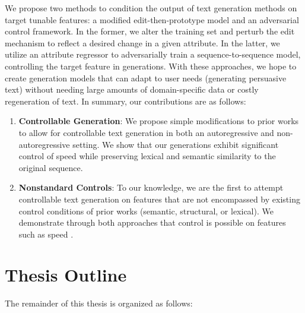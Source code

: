 We propose two methods to condition the output of text generation methods on target tunable features: a modified edit-then-prototype model \citep{guu2018generating} and an adversarial control framework. In the former, we alter the training set and perturb the edit mechanism to reflect a desired change in a given attribute. In the latter, we utilize an attribute regressor to adversarially train a sequence-to-sequence model, controlling the target feature in generations. With these approaches, we hope to create generation models that can adapt to user needs (\eg generating persuasive text) without needing large amounts of domain-specific data or costly regeneration of text. In summary, our contributions are as follows: 

\begin{enumerate}
    \item \textbf{Controllable Generation}: We propose simple modifications to prior works \citep{guu2018generating, moorjani-etal-2022-audience} to allow for controllable text generation in both an autoregressive and non-autoregressive setting. We show that our generations exhibit significant control of speed while preserving lexical and semantic similarity to the original sequence.
    \item \textbf{Nonstandard Controls}: To our knowledge, we are the first to attempt controllable text generation on features that are not encompassed by existing control conditions of prior works (\ie semantic, structural, or lexical). We demonstrate through both approaches that control is possible on features such as speed \citep{toubia-2021}.
\end{enumerate}




\section{Thesis Outline}
\label{sec:thesis_outline}
The remainder of this thesis is organized as follows:

